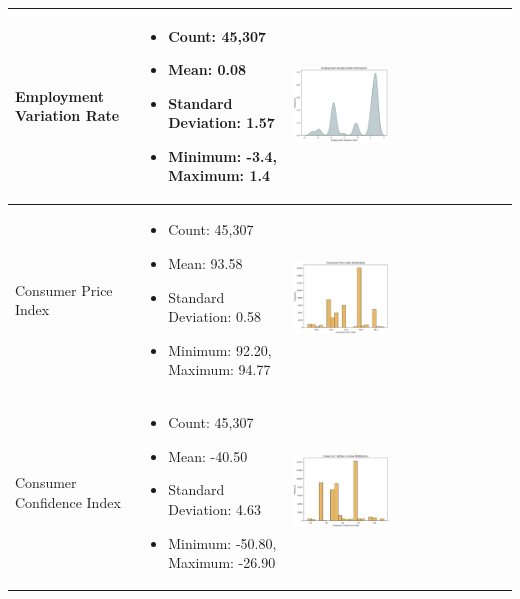 \documentclass{article}
\begin{document}
\begin{longtable}{|p{}|p{}|p{}|}
    \hline
    Employment Variation Rate & 
    \begin{itemize}
        \item Count: 45,307
        \item Mean: 0.08
        \item Standard Deviation: 1.57
        \item Minimum: -3.4, Maximum: 1.4
    \end{itemize} & 
    \includegraphics[width=0.45\textwidth]{data/bank_marketing/pic/Bank_Add_emp.png} \\
    \hline
    Consumer Price Index & 
    \begin{itemize}
        \item Count: 45,307
        \item Mean: 93.58
        \item Standard Deviation: 0.58
        \item Minimum: 92.20, Maximum: 94.77
    \end{itemize} & 
    \includegraphics[width=0.45\textwidth]{data/bank_marketing/pic/Bank_Add_cons_price.png} \\
    \hline
    Consumer Confidence Index & 
    \begin{itemize}
        \item Count: 45,307
        \item Mean: -40.50
        \item Standard Deviation: 4.63
        \item Minimum: -50.80, Maximum: -26.90
    \end{itemize} & 
    \includegraphics[width=0.45\textwidth]{data/bank_marketing/pic/Bank_Add_cons_conf.png} \\

\end{longtable}
\end{document}
